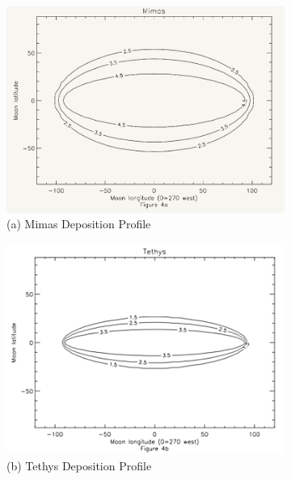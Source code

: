 \documentclass[11pt]{article} %
\begin{document}
		\begin{figure}[ht] \label{fig:ewater}
	\centering
		\begin{subfigure}[h]{0.5\textwidth}
			\includegraphics[width=\textwidth]{Paranicas_MimasDepositionProfile.png}
			\caption{(a) Mimas Deposition Profile}
		\end{subfigure}
		\begin{subfigure}[h]{0.5\textwidth}
			\includegraphics[width=\textwidth]{Paranicas_TethysDepositionProfile.png}
			\caption{(b) Tethys Deposition Profile}
		\end{subfigure}
		\begin{subfigure}[h]{0.5\textwidth}

\end{subfigure}
\end{figure}
\end{document}
